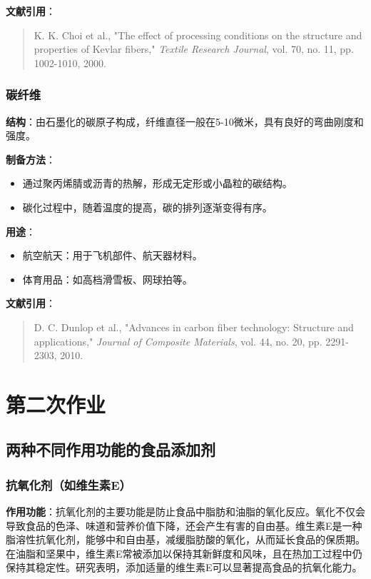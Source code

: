 \documentclass[UTF8]{report}
\theoremstyle{MyLineTheoremStyle} %
\theoremstyle{MyBlockTheoremStyle} %
\theoremstyle{MySubsubsectionStyle} %
\begin{document}
\textbf{文献引用}：
\begin{quote}
K. K. Choi et al., "The effect of processing conditions on the structure and properties of Kevlar fibers," \textit{Textile Research Journal}, vol. 70, no. 11, pp. 1002-1010, 2000.
\end{quote}

\subsection{碳纤维}
\textbf{结构}：由石墨化的碳原子构成，纤维直径一般在5-10微米，具有良好的弯曲刚度和强度。

\textbf{制备方法}：
\begin{itemize}
    \item 通过聚丙烯腈或沥青的热解，形成无定形或小晶粒的碳结构。
    \item 碳化过程中，随着温度的提高，碳的排列逐渐变得有序。
\end{itemize}

\textbf{用途}：
\begin{itemize}
    \item 航空航天：用于飞机部件、航天器材料。
    \item 体育用品：如高档滑雪板、网球拍等。
\end{itemize}

\textbf{文献引用}：
\begin{quote}
D. C. Dunlop et al., "Advances in carbon fiber technology: Structure and applications," \textit{Journal of Composite Materials}, vol. 44, no. 20, pp. 2291-2303, 2010.
\end{quote}





\chapter{第二次作业}

\section{两种不同作用功能的食品添加剂}

\subsection{抗氧化剂（如维生素E）}
\textbf{作用功能}：抗氧化剂的主要功能是防止食品中脂肪和油脂的氧化反应。氧化不仅会导致食品的色泽、味道和营养价值下降，还会产生有害的自由基。维生素E是一种脂溶性抗氧化剂，能够中和自由基，减缓脂肪酸的氧化，从而延长食品的保质期。在油脂和坚果中，维生素E常被添加以保持其新鲜度和风味，且在热加工过程中仍保持其稳定性。研究表明，添加适量的维生素E可以显著提高食品的抗氧化能力。
\end{document}
